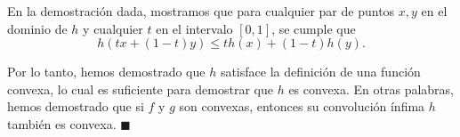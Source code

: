 \begin{enumerate}
	En la demostración dada, mostramos que para cualquier par de puntos $x, y$ en el dominio de $h$ y cualquier $t$ en el intervalo $[0,1]$, se cumple que
	$$h(tx + (1-t)y) \leq t h(x) + (1-t) h(y).$$

	Por lo tanto, hemos demostrado que $h$ satisface la definición de una función convexa, lo cual es suficiente para demostrar que $h$ es convexa. En otras palabras, hemos demostrado que si $f$ y $g$ son convexas, entonces su convolución ínfima $h$ también es convexa. $\blacksquare$ \\\\


    \begin{comment}
    \item  \textbf{\boldmath Sea ($\Omega, A, \mu$) un espacio de probabilidad, $g : \Omega \to \mathbb{R}$ $\mu$-integrable, $f$ convexa (no necesariamente diferenciable) con $Dom(f) = \mathbb{R}$. Demuestra que
	$$f\left(\int_{\Omega} g \;d\mu\right) \leq \int_{\Omega} (f\circ g) \; d\mu.$$
	En este caso, hemos supuesto que el dominio de $f$ es todo $\mathbb{R}$, ¿Qué debemos pedirle como mínimo al dominio de $f$ para que el resultado siga siendo cierto?.}\\
    \end{comment}

\end{enumerate}

